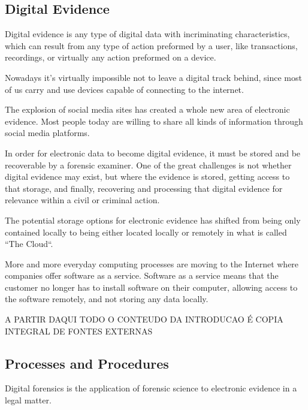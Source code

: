\subsection{Digital Evidence}

Digital evidence is any type of digital data with incriminating characteristics,
which can result from any type of action preformed by a user, like transactions,
recordings, or virtually any action preformed on a device.

Nowadays it's virtually impossible not to leave a digital track behind, since most
of us carry and use devices capable of connecting to the internet.

The explosion of social media sites has created a whole new area of electronic
evidence. Most people today are willing to share all kinds of information through
social media platforms.

In order for electronic data to become digital evidence, it must be stored and be recoverable
by a forensic examiner. One of the great challenges is not whether digital
evidence may exist, but where the evidence is stored, getting access to that storage,
and finally, recovering and processing that digital evidence for relevance within
a civil or criminal action.

The potential storage options for electronic evidence has shifted from being only contained locally
to being either located locally or remotely in what is called ``The Cloud``. 

More and more everyday computing processes are moving to the Internet
where companies offer software as a service. Software as a service means that
the customer no longer has to install software on their computer, allowing access to the software remotely,
and not storing any data locally.


\begin{center}
A PARTIR DAQUI TODO O CONTEUDO DA INTRODUCAO É COPIA INTEGRAL DE FONTES EXTERNAS
\end{center}

\subsection{Processes and Procedures}

Digital forensics is the application of forensic science to electronic evidence in a
legal matter.

